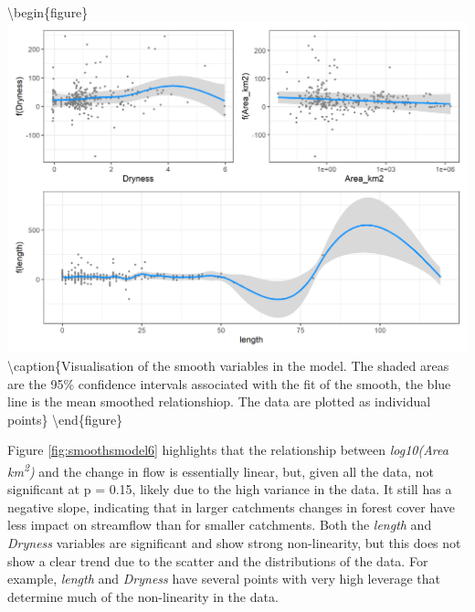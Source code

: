 \documentclass[]{elsarticle} %
\begin{document}
\textbackslash begin\{figure\}
\includegraphics[width=0.9\linewidth]{model6_smooths} \textbackslash caption\{Visualisation of the smooth variables in the model. The shaded areas are the 95\% confidence intervals associated with the fit of the smooth, the blue line is the mean smoothed relationshiop. The data are plotted as individual points\}\label{fig:smoothsmodel6}
\textbackslash end\{figure\}

Figure \ref{fig:smoothsmodel6} highlights that the relationship between \emph{log10(Area km\textsuperscript{2})} and the change in flow is essentially linear, but, given all the data, not significant at p = 0.15, likely due to the high variance in the data. It still has a negative slope, indicating that in larger catchments changes in forest cover have less impact on streamflow than for smaller catchments. Both the \emph{length} and \emph{Dryness} variables are significant and show strong non-linearity, but this does not show a clear trend due to the scatter and the distributions of the data. For example, \emph{length} and \emph{Dryness} have several points with very high leverage that determine much of the non-linearity in the data.
\end{document}
